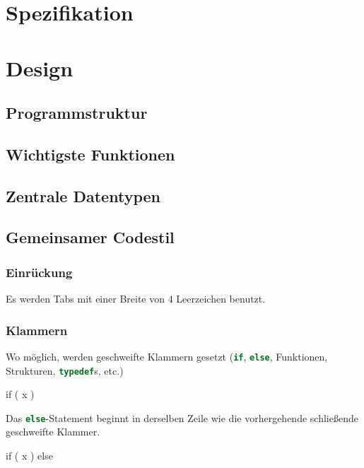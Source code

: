 \documentclass{homework-pp}
\date{\today}
\renewcommand{\c}[1]{\lstinline[language=c,basicstyle=\ttfamily]|#1|}
\begin{document}
\makeheadline

\section{Spezifikation}


\section{Design}

\subsection{Programmstruktur}
\subsection{Wichtigste Funktionen}
\subsection{Zentrale Datentypen}
\subsection{Gemeinsamer Codestil}

\subsubsection{Einrückung}

Es werden Tabs mit einer Breite von 4 Leerzeichen benutzt.

\subsubsection{Klammern}

Wo möglich, werden geschweifte Klammern gesetzt (\c{if}, \c{else}, Funktionen, Strukturen, \c{typedef}s, etc.)

\begin{cblock}
if ( x ) {

}
\end{cblock}

Das \c{else}-Statement beginnt in derselben Zeile wie die vorhergehende schließende geschweifte Klammer.

\begin{cblock}
if ( x ) {
} else {
}
\end{cblock}
\end{document}
